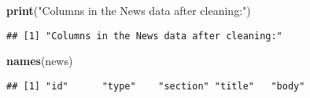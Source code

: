 \documentclass[]{article}
\newenvironment{Shaded}{\begin{snugshade}}{\end{snugshade}}
\newcommand{\KeywordTok}[1]{\textcolor[rgb]{0.13,0.29,0.53}{\textbf{#1}}}
\newcommand{\DataTypeTok}[1]{\textcolor[rgb]{0.13,0.29,0.53}{#1}}
\newcommand{\StringTok}[1]{\textcolor[rgb]{0.31,0.60,0.02}{#1}}
\newcommand{\OperatorTok}[1]{\textcolor[rgb]{0.81,0.36,0.00}{\textbf{#1}}}
\newcommand{\NormalTok}[1]{#1}
\begin{document}
\begin{table}[!h]
{\begin{tabular}[t]{lllll}
\bottomrule
\end{tabular}}
\end{table}


\begin{Shaded}
\begin{Highlighting}[]
\KeywordTok{print}\NormalTok{(}\StringTok{"Columns in the News data after cleaning:"}\NormalTok{)}
\end{Highlighting}
\end{Shaded}

\begin{verbatim}
## [1] "Columns in the News data after cleaning:"
\end{verbatim}

\begin{Shaded}
\begin{Highlighting}[]
\KeywordTok{names}\NormalTok{(news)}
\end{Highlighting}
\end{Shaded}

\begin{verbatim}
## [1] "id"      "type"    "section" "title"   "body"
\end{verbatim}

\begin{Shaded}
\end{Shaded}

\end{document}
